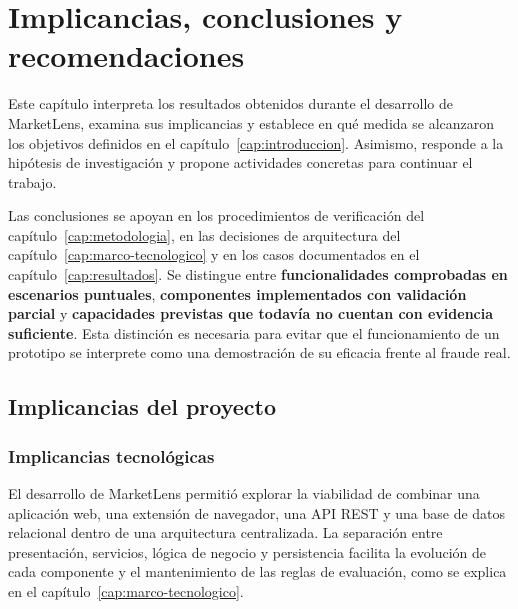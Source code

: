 
\chapter{Implicancias, conclusiones y recomendaciones}\label{cap:conclusiones}

Este capítulo interpreta los resultados obtenidos durante el desarrollo de MarketLens, examina sus implicancias y establece en qué medida se alcanzaron los objetivos definidos en el capítulo~\ref{cap:introduccion}. Asimismo, responde a la hipótesis de investigación y propone actividades concretas para continuar el trabajo.

Las conclusiones se apoyan en los procedimientos de verificación del capítulo~\ref{cap:metodologia}, en las decisiones de arquitectura del capítulo~\ref{cap:marco-tecnologico} y en los casos documentados en el capítulo~\ref{cap:resultados}. Se distingue entre \textbf{funcionalidades comprobadas en escenarios puntuales}, \textbf{componentes implementados con validación parcial} y \textbf{capacidades previstas que todavía no cuentan con evidencia suficiente}. Esta distinción es necesaria para evitar que el funcionamiento de un prototipo se interprete como una demostración de su eficacia frente al fraude real.

\section{Implicancias del proyecto}\label{sec:ml-implicancias}

\subsection{Implicancias tecnológicas}\label{subsec:ml-implicancias-tecnicas}

El desarrollo de MarketLens permitió explorar la viabilidad de combinar una aplicación web, una extensión de navegador, una API REST y una base de datos relacional dentro de una arquitectura centralizada. La separación entre presentación, servicios, lógica de negocio y persistencia facilita la evolución de cada componente y el mantenimiento de las reglas de evaluación, como se explica en el capítulo~\ref{cap:marco-tecnologico}.

